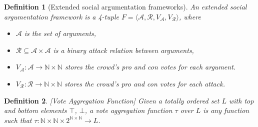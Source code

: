 \documentclass{article}
\date{ }
\newtheorem{definition}{Definition}
\newcommand{\nat}{\mathbb{N}}   %
\newcommand{\args}{\mathcal{A}} %
\newcommand{\att}{\mathcal{R}}  %
\newcommand{\valueset}{L}
\newcommand{\varg}{V_{\args}}   %
\newcommand{\vatt}{V_{\att}}   %
\newcommand{\safid}{F}               %
\newcommand{\saf}{\safid = \safbody} %
\newcommand{\safbody}{\langle \args, \att, \varg, \vatt \rangle} %
\begin{document}



\begin{definition}[Extended social argumentation frameworks]
An \emph{extended social argumentation framework} is a 4-tuple $\saf$, where
\begin{itemize}
  \item $\args$ is the set of arguments,
  \item $\att \subseteq \args \times \args$ is a binary attack relation between arguments,
  \item $\varg : \args \to \nat \times \nat$ stores the crowd's pro and con votes for each argument.
  \item $\vatt : \att \to \nat \times \nat$ stores the crowd's pro and con votes for each attack.
\end{itemize}
\end{definition}

\begin{definition}
\label{def:voteAgg}
[Vote Aggregation Function]
Given a totally ordered set $\valueset$ with top and bottom elements $\top$, $\bot$, a vote aggregation function $\tau$ over $\valueset$ is any function such that $\tau: \nat \times \nat \times {2}^{\nat \times \nat} \to L$.
\end{definition}
\end{document}
